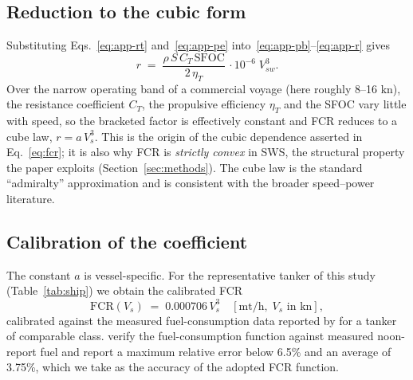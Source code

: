 \documentclass[review,authoryear]{elsarticle}
\newcommand{\fcr}{\mathrm{FCR}}
\begin{document}
\subsection{Reduction to the cubic form}
\label{app:fcr-cubic}
Substituting Eqs.~\eqref{eq:app-rt} and~\eqref{eq:app-pe} into~\eqref{eq:app-pb}--\eqref{eq:app-r}
gives
\begin{equation}
\label{eq:app-cubic}
r \;=\; \frac{\rho\,S\,C_T\,\mathrm{SFOC}}{2\,\eta_T}\,\cdot 10^{-6}\; V_{sw}^{3} .
\end{equation}
Over the narrow operating band of a commercial voyage (here roughly 8--16 kn), the resistance
coefficient $C_T$, the propulsive efficiency $\eta_T$ and the SFOC vary little with speed, so the
bracketed factor is effectively constant and FCR reduces to a cube law, $r = a\,V_s^{3}$. This is the
origin of the cubic dependence asserted in Eq.~\eqref{eq:fcr}; it is also why FCR is \emph{strictly
convex} in SWS, the structural property the paper exploits (Section~\ref{sec:methods}). The cube law
is the standard ``admiralty'' approximation and is consistent with the broader speed--power literature.

\subsection{Calibration of the coefficient}
\label{app:fcr-calib}
The constant $a$ is vessel-specific. For the representative tanker of this study
(Table~\ref{tab:ship}) we obtain the calibrated FCR
\begin{equation}
\label{eq:fcr}
\fcr(V_s) \;=\; 0.000706\, V_s^{3} \quad [\text{mt/h},\; V_s \text{ in kn}],
\end{equation}
calibrated against the measured fuel-consumption data reported by \citet{yang2020} for a tanker of
comparable class. \citet{yang2020} verify the fuel-consumption function against measured noon-report
fuel and report a maximum relative error below 6.5\% and an average of 3.75\%, which we take as the
accuracy of the adopted FCR function.
\end{document}
